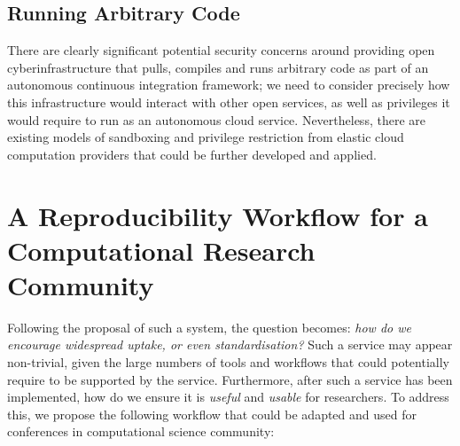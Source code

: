 \documentclass[conference]{IEEEtran}
\begin{document}
\subsection{Running Arbitrary Code}

There are clearly significant potential security concerns around
providing open cyberinfrastructure that pulls, compiles and runs
arbitrary code as part of an autonomous continuous integration
framework; we need to consider precisely how this infrastructure would
interact with other open services, as well as privileges it would
require to run as an autonomous cloud service. Nevertheless, there are
existing models of sandboxing and privilege restriction from elastic
cloud computation providers that could be further developed and
applied.


\section{A Reproducibility Workflow for a Computational Research Community}
\label{rollout}

Following the proposal of such a system, the question becomes:
{\emph{how do we encourage widespread uptake, or even
    standardisation?}}  Such a service may appear non-trivial, given
the large numbers of tools and workflows that could potentially
require to be supported by the service. Furthermore, after such a
service has been implemented, how do we ensure it is \emph{useful} and
\emph{usable} for researchers. To address this, we propose the
following workflow that could be adapted and used for conferences in computational
science community:
\end{document}
